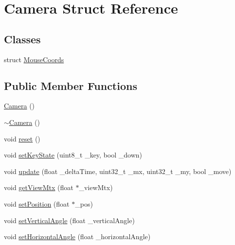 \hypertarget{struct_camera}{\section{Camera Struct Reference}
\label{struct_camera}
}
\subsection*{Classes}
\begin{DoxyCompactItemize}
\item 
struct \hyperlink{struct_camera_1_1_mouse_coords}{Mouse\+Coords}
\end{DoxyCompactItemize}
\subsection*{Public Member Functions}
\begin{DoxyCompactItemize}
\item 
\hyperlink{struct_camera_a01f94c3543f56ede7af49dc778f19331}{Camera} ()
\item 
\hyperlink{struct_camera_ad1897942d0ccf91052386388a497349f}{$\sim$\+Camera} ()
\item 
void \hyperlink{struct_camera_a02be8aa0dbef77e02dddc715a726fb67}{reset} ()
\item 
void \hyperlink{struct_camera_a9c4444ac9250031a234e033763a7d005}{set\+Key\+State} (uint8\+\_\+t \+\_\+key, bool \+\_\+down)
\item 
void \hyperlink{struct_camera_aa48e4d34e3d18b09170c87b5ce3968bc}{update} (float \+\_\+delta\+Time, uint32\+\_\+t \+\_\+mx, uint32\+\_\+t \+\_\+my, bool \+\_\+move)
\item 
void \hyperlink{struct_camera_a09b023160b32ba868d8afa4bebc2891f}{get\+View\+Mtx} (float $\ast$\+\_\+view\+Mtx)
\item 
void \hyperlink{struct_camera_ac7a1d4634eacb04672a7910e4e13e936}{set\+Position} (float $\ast$\+\_\+pos)
\item 
void \hyperlink{struct_camera_af6013c731be730a1524a8fcdd8f5f497}{set\+Vertical\+Angle} (float \+\_\+vertical\+Angle)
\item 
void \hyperlink{struct_camera_a589b2a9fa380a273d948bc48c3f68504}{set\+Horizontal\+Angle} (float \+\_\+horizontal\+Angle)
\end{DoxyCompactItemize}
